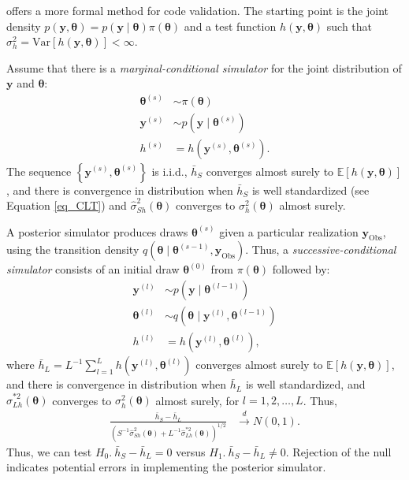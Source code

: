 \cite{geweke2004getting} offers a more formal method for code validation. The starting point is the joint density $p(\bm{y},\bm{\theta})=p(\bm{y}\mid \bm{\theta})\pi(\bm{\theta})$ and a test function $h(\bm{y},\bm{\theta})$ such that $\sigma_h^2=\text{Var}[h(\bm{y},\bm{\theta})]<\infty$.

Assume that there is a \textit{marginal-conditional simulator} for the joint distribution of $\bm{y}$ and $\bm{\theta}$:
\begin{align*}
	\bm{\theta}^{(s)} &\sim \pi(\bm{\theta})\\
	\bm{y}^{(s)} &\sim p(\bm{y}\mid \bm{\theta}^{(s)})\\
	h^{(s)} &= h(\bm{y}^{(s)},\bm{\theta}^{(s)}). 
\end{align*}
The sequence $\left\{\bm{y}^{(s)},\bm{\theta}^{(s)}\right\}$ is i.i.d., $\bar{h}_S$ converges almost surely to $\mathbb{E}[h(\bm{y},\bm{\theta})]$, and there is convergence in distribution when $\bar{h}_S$ is well standardized (see Equation \ref{eq_CLT}) and $\hat{\sigma}^2_{Sh}(\bm{\theta})$ converges to ${\sigma}^2_h(\bm{\theta})$ almost surely.

A posterior simulator produces draws $\bm{\theta}^{(s)}$ given a particular realization $\bm{y}_{\text{Obs}}$, using the transition density $q(\bm{\theta}\mid \bm{\theta}^{(s-1)},\bm{y}_{\text{Obs}})$. Thus, a \textit{successive-conditional simulator} consists of an initial draw $\bm{\theta}^{(0)}$ from $\pi(\bm{\theta})$ followed by:
\begin{align*}
	\bm{y}^{(l)} &\sim p(\bm{y}\mid \bm{\theta}^{(l-1)})\\
	\bm{\theta}^{(l)} &\sim q(\bm{\theta}\mid \bm{y}^{(l)},\bm{\theta}^{(l-1)})\\
	h^{(l)} &= h(\bm{y}^{(l)},\bm{\theta}^{(l)}), 
\end{align*}
where $\bar{h}_L=L^{-1}\sum_{l=1}^L h(\bm{y}^{(l)},\bm{\theta}^{(l)})$ converges almost surely to $\mathbb{E}[h(\bm{y},\bm{\theta})]$, and there is convergence in distribution when $\bar{h}_L$ is well standardized, and $\hat{\sigma}^{*2}_{Lh}(\bm{\theta})$ converges to ${\sigma}^2_h(\bm{\theta})$ almost surely, for $l=1,2,\dots,L$. Thus,
\begin{align*}
	\frac{\bar{h}_S-\bar{h}_L}{\left(S^{-1}\hat{\sigma}^2_{Sh}(\bm{\theta})+L^{-1}\hat{\sigma}^{*2}_{Lh}(\bm{\theta})\right)^{1/2}} &\stackrel{d}{\rightarrow} N(0,1).
\end{align*}
Thus, we can test $H_0. \ \bar{h}_S-\bar{h}_L=0$ versus $H_1. \ \bar{h}_S-\bar{h}_L\neq 0$. Rejection of the null indicates potential errors in implementing the posterior simulator.\\

